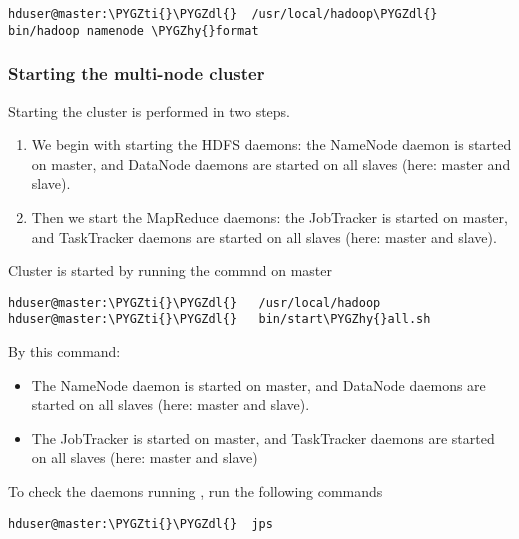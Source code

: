 \documentclass[letterpaper,10pt,english]{sphinxmanual}
\def\PYGZdl{\char`\$}
\def\PYGZhy{\char`\-}
\def\PYGZti{\char`\~}
\begin{document}
\begin{Verbatim}[commandchars=\\\{\}]
hduser@master:\PYGZti{}\PYGZdl{}  /usr/local/hadoop\PYGZdl{} bin/hadoop namenode \PYGZhy{}format
\end{Verbatim}


\subsubsection{Starting the multi-node cluster}
\label{hadoop:starting-the-multi-node-cluster}
Starting the cluster is performed in two steps.
\begin{enumerate}
\item {} 
We begin with starting the HDFS daemons: the NameNode daemon is started on master, and DataNode daemons are started on all slaves (here: master and slave).

\item {} 
Then we start the MapReduce daemons: the JobTracker is started on master, and TaskTracker daemons are started on all slaves (here: master and slave).

\end{enumerate}

Cluster is started by running the commnd on master

\begin{Verbatim}[commandchars=\\\{\}]
hduser@master:\PYGZti{}\PYGZdl{}   /usr/local/hadoop
hduser@master:\PYGZti{}\PYGZdl{}   bin/start\PYGZhy{}all.sh
\end{Verbatim}

By this command:
\begin{itemize}
\item {} 
The NameNode daemon is started on master, and DataNode daemons are started on all slaves (here: master and slave).

\item {} 
The JobTracker is started on master, and TaskTracker daemons are started on all slaves (here: master and slave)

\end{itemize}

To check the daemons running , run the following commands

\begin{Verbatim}[commandchars=\\\{\}]
hduser@master:\PYGZti{}\PYGZdl{}  jps
\end{Verbatim}
\end{document}
